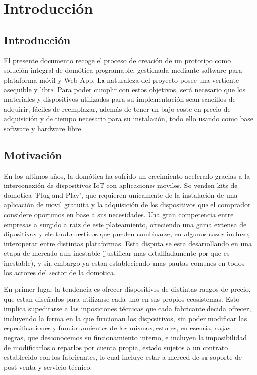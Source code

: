 \cleardoublepage

\chapter{Introducción}

\section{Introducción}
\label{ch:Capitulo1}
El presente documento recoge el proceso de creación de un prototipo como solución integral de domótica programable, gestionada mediante software para plataforma móvil y Web App. La naturaleza del proyecto posee una vertiente asequible y libre. Para poder cumplir con estos objetivos, será necesario que los materiales y dispositivos utilizados para su implementación sean sencillos de adquirir, fáciles de reemplazar, además de tener un bajo coste en precio de adquisición y de tiempo necesario para su instalación, todo ello usando como base software y hardware libre.

\section{Motivación}
\label{ch:Capitulo1.1}

En los ultimos años, la domótica ha sufrido un crecimiento acelerado gracias a la interconexión de dispositivos IoT con aplicaciones moviles. So venden kits de domotica 'Plug and Play', que requieren unicamente de la instalación de una aplicación de movil gratuita y la adquisición de los dispositivos que el comprador considere oportunos en base a sus necesidades. Una gran competencia entre empresas a surgido a raiz de este plateamiento, ofreciendo una gama extensa de dipositivos y electrodomesticos que pueden combinarse, en algunos casos incluso, interoperar entre distintas plataformas. Esta disputa se esta desarrollando en una etapa de mercado aun inestable (justificar mas detallladamente por que es inestable), y sin embargo ya estan estableciendo unas pautas comunes en todos los actores del sector de la domotica.

En primer lugar la tendencia es ofrecer dispositivos de distintas rangos de precio, que estan diseñados para utilizarse cada uno en sus propios ecosistemas. Esto implica supeditarse a las inposiciones técnicas que cada fabricante decida ofrecer, incluyendo la forma en la que funcionan los dispositivos, sin poder modificar las especificaciones y funcionamientos de los mismos, esto es, en esencia, cajas negras, que desconocemos su fincionamiento interno, e incluyen la imposibilidad de modificarlos o reparlos por cuenta propia, estado sujetos a un contrato establecido con los fabricantes, lo cual incluye estar a merced de su soporte de post-venta y servicio técnico.

